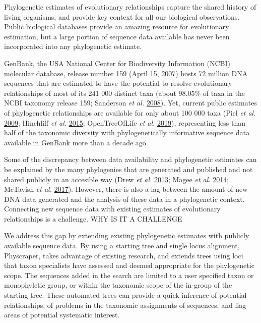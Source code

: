 \documentclass[]{article}
\begin{document}
Phylogenetic estimates of evolutionary relationships capture the shared history of living organisms, and provide key context for all our biological observations.
Public biological databases provide an amazing resource for evolutionary estimation, but a large portion of sequence data available has never been incorporated into any phylogenetic estimate.

GenBank, the USA National Center for Biodiversity Information (NCBI) molecular database, release number 159 (April 15, 2007) hosts 72 million DNA sequences that are estimated to have the potential to resolve evolutionary relationships of most of its 241 000 distinct taxa (about 98.05\% of taxa in the NCBI taxonomy release 159; Sanderson \emph{et al.} \protect\hyperlink{ref-sanderson2008phylota}{2008}).
Yet, current public estimates of phylogenetic relationships are available for only about 100 000 taxa (Piel \emph{et al.} \protect\hyperlink{ref-piel2009treebase}{2009}; Hinchliff \emph{et al.} \protect\hyperlink{ref-hinchliff2015synthesis}{2015}; OpenTreeOfLife \emph{et al.} \protect\hyperlink{ref-opentreeoflife2019synth}{2019}), representing less than half of the taxonomic diversity with phylogenetically informative sequence data available in GenBank more than a decade ago.

Some of the discrepancy between data availability and phylogenetic estimates can be explained by the many phylogenies that are generated and published and not shared publicly in an accesible way (Drew \emph{et al.} \protect\hyperlink{ref-drew2013lost}{2013}; Magee \emph{et al.} \protect\hyperlink{ref-magee2014dawn}{2014}; McTavish \emph{et al.} \protect\hyperlink{ref-mctavish2018bioessay}{2017}). However, there is also a lag between the amount of new DNA data generated and the analysis of these data in a phylogenetic context. Connecting new sequence data with existing estimates of evolutionary relationships is a challenge.
WHY IS IT A CHALLENGE

We address this gap by extending existing phylogenetic estimates with publicly available sequence data. By using a starting tree and single locus alignment, Physcraper, takes advantage of existing research, and extends trees using loci that taxon specialists have assessed and deemed appropriate for the phylogenetic scope.
The sequences added in the search are limited to a user specified taxon or monophyletic group, or within the taxonomic scope of the in-group of the starting tree.
These automated trees can provide a quick inference of potential relationships, of problems in the taxonomic assignments of sequences, and flag areas of potential systematic interest.
\end{document}
